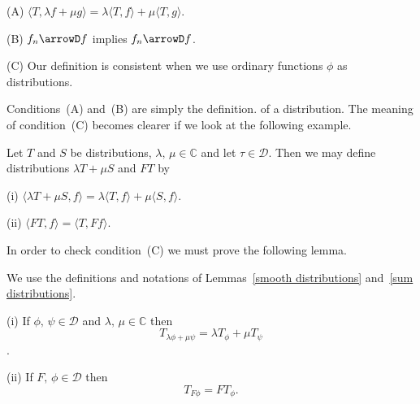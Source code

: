 (A) $\langle T,\lambda f+\mu g\rangle=
\lambda \langle T,f\rangle
+\mu \langle T,g\rangle$.

(B) $f_{n}\arrowD f$ implies $f_{n}\arrowD f$.

(C) Our definition is consistent when we use ordinary
functions $\phi$ as distributions.

\noindent Conditions~(A) and~(B) are simply the definition.
of a distribution. The meaning of condition~(C) becomes
clearer if we look at the following example.
\begin{lemma}\label{sum distributions}
Let $T$ and $S$ be distributions,
$\lambda,\,\mu\in{\mathbb C}$ and
let $\tau\in{\mathcal D}$. Then we may define distributions
$\lambda T+\mu S$ and $FT$ by

(i) $\langle\lambda T+\mu S,f\rangle=\lambda\langle T,f\rangle
+\mu \langle S,f\rangle$.

(ii) $\langle FT,f\rangle=\langle T,Ff\rangle$.
\end{lemma}
In order to check condition~(C) we must prove the following lemma.
\begin{lemma} We use the definitions and notations of
Lemmas~\ref{smooth distributions} and~\ref{sum distributions}.

(i) If $\phi,\,\psi\in{\mathcal D}$ and
$\lambda,\,\mu\in{\mathbb C}$ then
\[T_{\lambda\phi+\mu\psi}=\lambda T_{\phi}+\mu T_{\psi}\].

(ii) If $F,\, \phi\in{\mathcal D}$ then
\[T_{F\phi}=FT_{\phi}.\]
\end{lemma}

